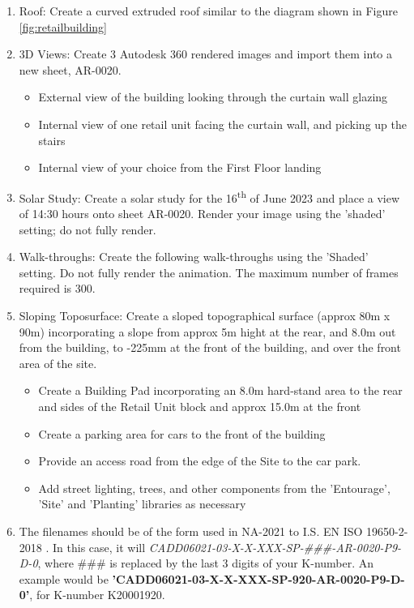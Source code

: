 \begin{enumerate}
	\item Roof: Create a curved extruded roof similar to the diagram shown in Figure \ref{fig:retailbuilding}
	
	\item 3D Views: Create 3 Autodesk 360 rendered images and import them into a new sheet, AR-0020.
	\begin{itemize}
		\item External view of the building looking through the curtain wall glazing
		\item Internal view of one retail unit facing the curtain wall, and picking up the stairs
		\item Internal view of your choice from the First Floor landing 
	\end{itemize} 
	\item Solar Study: Create a solar study for the 16\textsuperscript{th} of June 2023 and place a view of 14:30 hours onto sheet AR-0020.  Render your image using the 'shaded' setting; do not fully render.  
	\item Walk-throughs: Create the following walk-throughs using the 'Shaded' setting.  Do not fully render the animation.  The maximum number of frames required is 300.
	\item Sloping Toposurface: Create a sloped topographical surface (approx 80m x 90m) incorporating a slope from approx 5m hight at the rear, and 8.0m out from the building, to -225mm at the front of the building, and over the front area of the site.
	\begin{itemize}
		\item Create a Building Pad incorporating an 8.0m hard-stand area to the rear and sides of the Retail Unit block and approx 15.0m at the front
		\item Create a parking area for cars to the front of the building
		\item Provide an access road from the edge of the Site to the car park.
		\item Add street lighting, trees, and other components from the 'Entourage', 'Site' and 'Planting' libraries as necessary 
	\end{itemize}
	\item The filenames should be of the form used in NA-2021 to I.S. EN ISO 19650-2-2018
.  In this case, it will \textit{CADD06021-03-X-X-XXX-SP-\#\#\#-AR-0020-P9-D-0}, where \#\#\# is replaced by the last 3 digits of your K-number. An example would be \textbf{'CADD06021-03-X-X-XXX-SP-920-AR-0020-P9-D-0'}, for K-number K20001920.
\end{enumerate}

